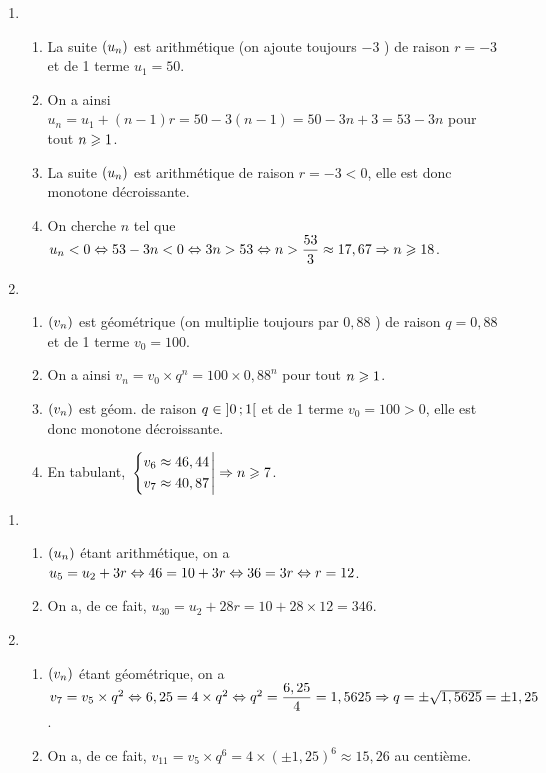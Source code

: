 \documentclass[a4paper,11pt]{article}
\begin{document}
\begin{enumerate}
	\item 
	\begin{enumerate}
		\item La suite $\suiten$ est arithmétique (\og on ajoute toujours $-3$ \fg) de raison $r=-3$ et de 1 terme $u_1=50$.
		\item On a ainsi $u_n = u_1 + (n-1)r=50-3(n-1)=50-3n+3=53-3n$ pour tout $n \pg 1$.
		\item La suite $\suiten$ est arithmétique de raison $r=-3<0$, elle est donc monotone décroissante.
		\item On cherche $n$ tel que $u_n <0 \ssi 53-3n < 0 \ssi 3n > 53 \ssi n > \dfrac{53}{3} \approx 17,67 \Rightarrow n \pg 18$.
	\end{enumerate}
	\item 
	\begin{enumerate}
		\item $\suiten[v]$ est géométrique (\og on multiplie toujours par $0,88$ \fg) de raison $q=0,88$ et de 1 terme $v_0=100$.
		\item On a ainsi $v_n = v_0 \times q^n = 100 \times 0,88^n$ pour tout $n \pg 1$.
		\item $\suiten[v]$ est géom. de raison $q \in \intervOO{0}{1}$ et de 1 terme $v_0 = \num{100} > 0$, elle est donc monotone décroissante.
		\item En tabulant, $\left. \begin{dcases} v_{6} \approx 46,44 \\ v_{7} \approx 40,87 \end{dcases} \right| \Rightarrow n \pg 7$.
	\end{enumerate} 
\end{enumerate}

\smallskip


\begin{enumerate}
	\item 
	\begin{enumerate}
		\item $\suiten$ étant arithmétique, on a $u_5 = u_2 + 3r \ssi 46 = 10+3r \ssi 36 = 3 r \ssi r=12$.
		\item On a, de ce fait, $u_{30}=u_2+28r = 10 + 28 \times 12 = 346$.
	\end{enumerate}
	\item 
	\begin{enumerate}
		\item $\suiten[v]$ étant géométrique, on a $v_7 = v_5 \times q^2 \ssi 6,25 = 4 \times q^2 \ssi q^2 = \dfrac{6,25}{4}=1,5625 \Rightarrow q=\pm \sqrt{1,5625}=\pm 1,25$.
		\item On a, de ce fait, $v_{11}=v_5 \times q^6 = 4 \times (\pm 1,25)^6 \approx 15,26$ au centième.
	\end{enumerate}
\end{enumerate}
\end{document}
